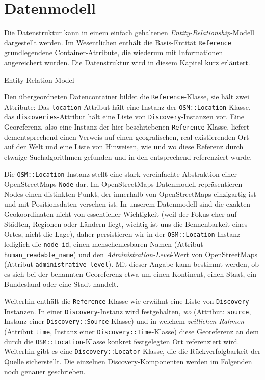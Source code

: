 \section{Datenmodell}
\label{datenmodell}

Die Datenstruktur kann in einem einfach gehaltenen \textit{Entity-Relationship}-Modell dargestellt werden. Im Wesentlichen enthält  die Basis-Entität \texttt{Reference}  grundlegendene Container-Attribute, die wiederum mit Informationen angereichert wurden. Die Datenstruktur wird in diesem Kapitel kurz erläutert.

Entity Relation Model

Den übergeordneten Datencontainer bildet die \texttt{Reference}-Klasse, sie hält zwei Attribute: Das \texttt{location}-Attribut hält eine Instanz der \texttt{OSM::Location}-Klasse, das \texttt{discoveries}-Attribut hält eine Liste von \texttt{Discovery}-Instanzen vor. Eine Georeferenz, also eine Instanz der hier beschriebenen  \texttt{Reference}-Klasse, liefert dementsprechend einen Verweis auf einen geografischen, real existierenden Ort auf der Welt und eine Liste von Hinweisen, wie und wo diese Referenz durch etwaige Suchalgorithmen gefunden und in den entsprechend referenziert wurde.

Die \texttt{OSM::Location}-Instanz stellt eine stark vereinfachte Abstraktion einer OpenStreetMaps \texttt{Node}\cite{OSMnode} dar. Im OpenStreetMaps-Datenmodell repräsentieren Nodes einen distinkten Punkt, der innerhalb von OpenStreetMaps einzigartig ist und mit Positionsdaten versehen ist. In unserem Datenmodell sind die exakten Geokoordinaten nicht von essentieller Wichtigkeit (weil der Fokus eher auf Städten, Regionen oder Ländern liegt, wichtig ist uns die Bennenbarkeit eines Ortes, nicht die Lage), daher persistieren wir in der \texttt{OSM::Location}-Instanz lediglich die \texttt{node\_id}, einen menschenlesbaren Namen (Attribut \texttt{human\_readable\_name}) und den \textit{Administration-Level}-Wert von OpenStreetMaps\cite{OSMadminlevel} (Attribut \texttt{administrative\_level}). Mit dieser Angabe kann bestimmt werden, ob es sich bei der benannten Georeferenz etwa um einen Kontinent, einen Staat, ein Bundesland oder eine Stadt handelt.

Weiterhin enthält die \texttt{Reference}-Klasse wie erwähnt eine Liste von \texttt{Discovery}-Instanzen. In einer \texttt{Discovery}-Instanz wird festgehalten, \textit{wo} (Attribut: \texttt{source}, Instanz einer \texttt{Discovery::Source}-Klasse) und in welchem \textit{zeitlichen Rahmen} (Attribut \texttt{time}, Instanz einer \texttt{Discovery::Time}-Klasse) diese Georeferenz an dem durch die \texttt{OSM::Location}-Klasse konkret festgelegten Ort referenziert wird. Weiterhin gibt es eine \texttt{Discovery::Locator}-Klasse, die die Rückverfolgbarkeit der Quelle sicherstellt. Die einzelnen Discovery-Komponenten werden im Folgenden noch genauer geschrieben.

